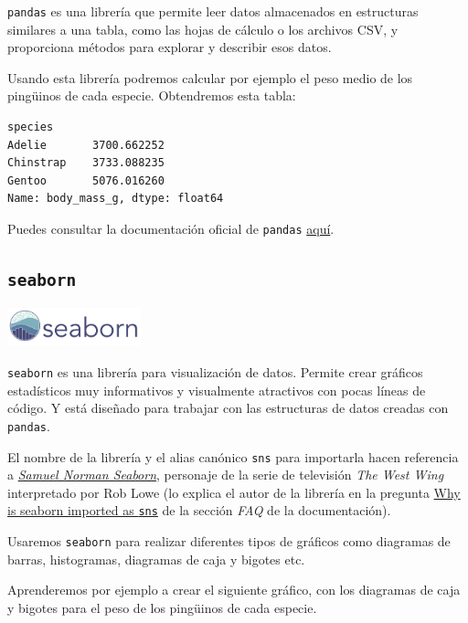 \documentclass[
  a4paper,
  noprof,
  12pt,
  notoc,
  nosols,
  nobib]{mnye}
\theoremstyle{definition}
\theoremstyle{remark}
\begin{document}
\texttt{pandas} es una librería que permite leer datos almacenados en
estructuras similares a una tabla, como las hojas de cálculo o los
archivos CSV, y proporciona métodos para explorar y describir esos
datos.

Usando esta librería podremos calcular por ejemplo el peso medio de los
pingüinos de cada especie. Obtendremos esta tabla:

\begin{verbatim}
species
Adelie       3700.662252
Chinstrap    3733.088235
Gentoo       5076.016260
Name: body_mass_g, dtype: float64
\end{verbatim}

Puedes consultar la documentación oficial de \texttt{pandas}
\href{https://pandas.pydata.org/docs/index.html}{aquí}.

\subsection{\texorpdfstring{\texttt{seaborn}}{seaborn}}\label{seaborn}

\begin{center}
\includegraphics[width=\textwidth,height=3em]{chapters/../img/seaborn.png}
\end{center}

\texttt{seaborn} es una librería para visualización de datos. Permite
crear gráficos estadísticos muy informativos y visualmente atractivos
con pocas líneas de código. Y está diseñado para trabajar con las
estructuras de datos creadas con \texttt{pandas}.

El nombre de la librería y el alias canónico \texttt{sns} para
importarla hacen referencia a
\href{https://en.wikipedia.org/wiki/Sam_Seaborn}{\emph{Samuel Norman
Seaborn}}, personaje de la serie de televisión \emph{The West Wing}
interpretado por Rob Lowe (lo explica el autor de la librería en la
pregunta
\href{https://seaborn.pydata.org/faq.html\#why-is-seaborn-imported-as-sns}{Why
is seaborn imported as \texttt{sns}} de la sección \emph{FAQ} de la
documentación).

Usaremos \texttt{seaborn} para realizar diferentes tipos de gráficos
como diagramas de barras, histogramas, diagramas de caja y bigotes etc.

Aprenderemos por ejemplo a crear el siguiente gráfico, con los diagramas
de caja y bigotes para el peso de los pingüinos de cada especie.
\end{document}
